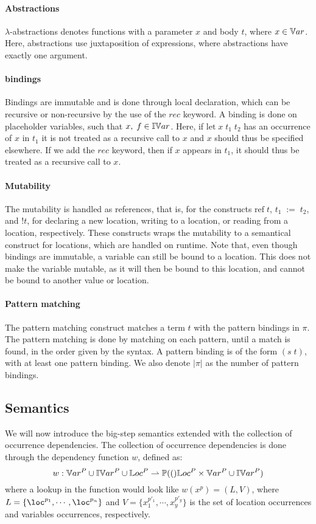 \documentclass[../../master.tex]{subfiles}
\begin{document}
\paragraph{Abstractions}
$\lambda$-abstractions denotes functions with a parameter $x$ and body $t$, where $x\in\mathbb{V}ar$.
Here, abstractions use juxtaposition of expressions, where abstractions have exactly one argument.

\paragraph{bindings}
Bindings are immutable and is done through local declaration, which can be recursive or non-recursive by the use of the $rec$ keyword.
A binding is done on placeholder variables, such that $x,\;f\in\mathbb{IV}ar$.
Here, if $\mbox{let}\;x\;t_1\;t_2$ has an occurrence of $x$ in $t_1$ it is not treated as a recursive call to $x$ and $x$ should thus be specified elsewhere.
If we add the $rec$ keyword, then if $x$ appears in $t_1$, it should thus be treated as a recursive call to $x$.

\paragraph{Mutability}
The mutability is handled as references, that is, for the constructs $\mbox{ref}\;t$, $t_1\;:=\;t_2$, and $!t$, for declaring a new location, writing to a location, or reading from a location, respectively.
These constructs wraps the mutability to a semantical construct for locations, which are handled on runtime.
Note that, even though bindings are immutable, a variable can still be bound to a location.
This does not make the variable mutable, as it will then be bound to this location, and cannot be bound to another value or location.

\paragraph{Pattern matching}
The pattern matching construct matches a term $t$ with the pattern bindings in $\pi$.
The pattern matching is done by matching on each pattern, until a match is found, in the order given by the syntax.
A pattern binding is of the form $(s\;t)$, with at least one pattern binding.
We also denote $|\pi|$ as the number of pattern bindings.

\subsection{Semantics}\label{sec:sem}
We will now introduce the big-step semantics extended with the collection of occurrence dependencies.
The collection of occurrence dependencies is done through the dependency function $w$, defined as:
$$w:\mathbb{V}ar^P\cup\mathbb{IV}ar^P\cup\mathbb{L}oc^P\rightharpoonup\mathbb{P}(()\mathbb{L}oc^P\times\mathbb{V}ar^P\cup\mathbb{IV}ar^P)$$
where a lookup in the function would look like $w(x^p)=(L,V)$, where $L=\{\loc^{p_1},\cdots,\loc^{p_n}\}$ and $V=\{x_1^{p'_1},\cdots,x_y^{p'_y}\}$ is the set of location occurrences and variables occurrences, respectively.
\end{document}
